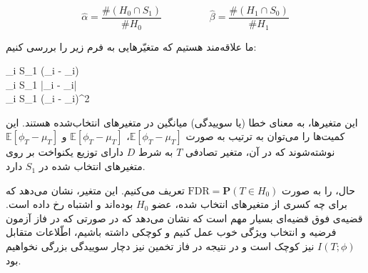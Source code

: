 \documentclass[a4paper,12pt]{article}
\newcommand{\E}{\mathbb{E}}
\begin{document}
	$$\hat{\alpha} = \frac{\#(H_0\cap S_1)}{\#H_0} \hspace{2cm} \hat{\beta} = \frac{\#(H_1\cap S_0)}{\#H_1}$$
	
	ما علاقه‌مند هستیم که متغیّر‌هایی به فرم زیر را بررسی کنیم:
	\begin{flalign}
	 \sum_{i \in S_1} (\phi_i - \mu_i)\\
	 \sum_{i \in S_1} |\phi_i - \mu_i|\\
	 \sum_{i \in S_1} (\phi_i - \mu_i)^2
	\end{flalign}
	این متغیر‌ها، به معنای خطا (یا سوییدگی) میانگین در متغیر‌های انتخاب‌شده هستند. این کمیت‌ها را می‌توان به ترتیب به صورت
	$\E[\phi_T - \mu_T]$،
	$\E[\phi_T - \mu_T]$
	و
	$\E[\phi_T - \mu_T]$
	نوشته‌شوند که در آن، متغیر تصادفی 
	$T$
	به شرط
	$D$ 
	دارای توزیع یکنواخت بر روی متغیر‌های انتخاب شده در $S_1$ دارد.
	
	حال،
	را به صورت
	$\mathrm{FDR} = \mathbf{P}(T \in H_0)$
	تعریف می‌کنیم. این متغیر، نشان می‌دهد که برای چه کسری از متغیر‌های انتخاب شده، عضو 
	$H_0$
	بوده‌اند و اشتباه رخ داده است. قضیه‌ی فوق قضیه‌ای بسیار مهم است که نشان می‌دهد که در صورتی که در فاز آزمون فرضیه و انتخاب ویژگی خوب عمل کنیم و 
	کوچکی داشته باشیم، اطّلاعات متقابل 
	$I(T;\phi)$
	نیز کوچک است و در نتیجه در فاز تخمین نیز دچار سوییدگی بزرگی نخواهیم بود.
	
\end{document}
